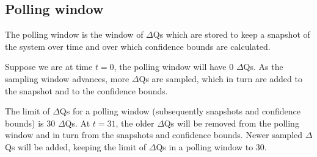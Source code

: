     \subsection{Polling window}
        The polling window is the window of $\Delta$Qs which are stored to keep a snapshot of the system over time and over which confidence bounds are calculated.
        
        Suppose we are at time $t = 0$, the polling window will have 0 $\Delta$Qs. As the sampling window advances, more $\Delta$Qs are sampled, which in turn are added to the snapshot and to the confidence bounds.

        The limit of $\Delta$Qs for a polling window (subsequently snapshots and confidence bounds) is 30 $\Delta$Qs. At $t= 31$, the older $\Delta$Qs will be removed from the polling window and in turn from the snapshots and confidence bounds. Newer sampled $\Delta$Qs will be added, keeping the limit of $\Delta$Qs in a polling window to 30.

